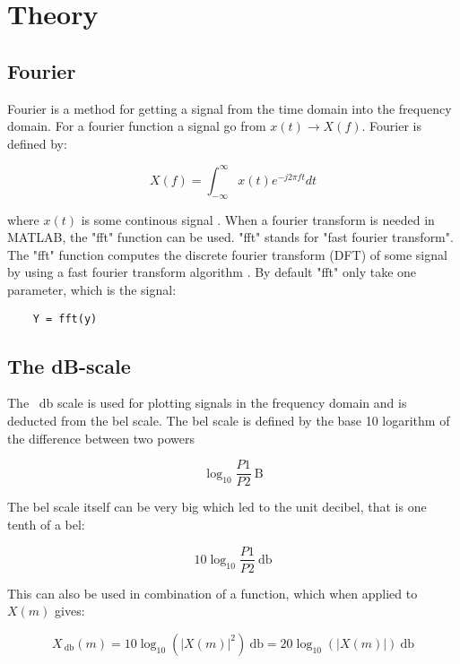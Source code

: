 \section{Theory}

\subsection{Fourier}

Fourier is a method for getting a signal from the time domain into the frequency domain. 
For a fourier function a signal go from $x(t) \rightarrow X(f)$. Fourier is defined by:

\begin{equation}
X(f) = \int_{-\infty}^{\infty} x(t)e^{-j2\pi ft}dt
\end{equation}

where $x(t)$ is some continous signal \cite[p. 53]{DSP}. 
When a fourier transform is needed in MATLAB, the "fft" function can be used. 
"fft" stands for "fast fourier transform". 
The "fft" function computes the discrete fourier transform (DFT) of some signal by using a fast fourier transform algorithm \cite[fft]{MATLAB_DOC}. 
By default "fft" only take one parameter, which is the signal:

\begin{verbatim}
	Y = fft(y)
\end{verbatim}

\subsection{The dB-scale}

The \SI{}{\decibel} scale is used for plotting signals in the frequency domain and is deducted from the bel scale. 
The bel scale is defined by the base 10 logarithm of the difference between two powers\cite[Appendix E]{DSP}

\[
\log_{10}\frac{P1}{P2}\SI{}{\bel}
\] 

The bel scale itself can be very big which led to the unit decibel, that is one tenth of a bel:

\begin{equation}
10\log_{10}\frac{P1}{P2}\SI{}{\decibel}
\end{equation}

This can also be used in combination of a function, which when applied to $X(m)$ gives:

\begin{equation}
X_{\SI{}{\decibel}}(m) = 10\log_{10}(|X(m)|^2)\SI{}{\decibel} = 20\log_{10}(|X(m)|)\SI{}{\decibel}
\end{equation}

